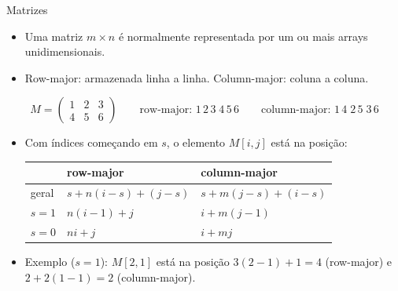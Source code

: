 \documentclass[aspectratio=169,10pt]{beamer}
\begin{document}
\begin{frame}{Matrizes}
  \begin{itemize}
    \item Uma matriz $m\times n$ é normalmente representada por um ou mais arrays unidimensionais.
    \item \alert{Row-major}: armazenada linha a linha. \alert{Column-major}: coluna a coluna.
  \end{itemize}
  \[
    M = \begin{pmatrix} 1 & 2 & 3\\ 4 & 5 & 6 \end{pmatrix}
    \qquad \text{row-major: } 1\,2\,3\;4\,5\,6
    \qquad \text{column-major: } 1\,4\;2\,5\;3\,6
  \]
  \begin{itemize}
    \item Com índices começando em $s$, o elemento $M[i,j]$ está na posição:
      \begin{center}
        \begin{tabular}{lll}
          \toprule
                   & row-major & column-major \\ \midrule
          geral    & $s + n(i-s) + (j-s)$ & $s + m(j-s) + (i-s)$ \\
          $s=1$    & $n(i-1) + j$         & $i + m(j-1)$ \\
          $s=0$    & $ni + j$             & $i + mj$ \\
          \bottomrule
        \end{tabular}
      \end{center}
    \item Exemplo ($s=1$): $M[2,1]$ está na posição $3(2-1)+1 = 4$ (row-major)
          e $2 + 2(1-1) = 2$ (column-major).
  \end{itemize}
\end{frame}
\end{document}
